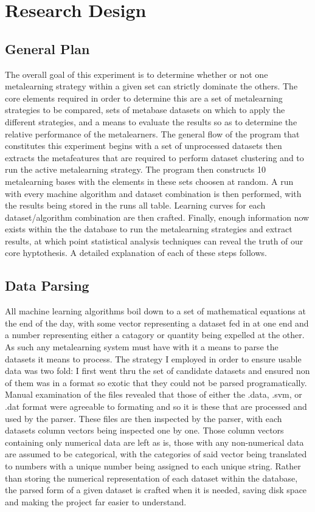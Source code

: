 \chapter{Research Design}
\label{Chapter3}
\section{General Plan}
The overall goal of this experiment is to determine whether or not one metalearning strategy within a given
set can strictly dominate the others. The core elements required in order to determine this are a set of metalearning strategies to be compared, sets of metabase datasets on which to apply the different strategies,
and a means to evaluate the results so as to determine the relative performance of the metalearners. The
general flow of the program that constitutes this experiment begins with a set of unprocessed datasets
then extracts the metafeatures that are required to perform dataset clustering and to run the active
metalearning strategy. The program then constructs 10 metalearning bases with the elements in these sets
choosen at random. A run with every machine algorithm and dataset combination is then performed, with the
results being stored in the runs all table. Learning curves for each dataset/algorithm combination are then crafted. Finally, enough information now exists within the the database to run the metalearning strategies
and extract results, at which point statistical analysis techniques can reveal the truth of our core
hyptothesis. A detailed explanation of each of these steps follows.

\section{Data Parsing}
All machine learning algorithms boil down to a set of mathematical equations at the end of the day, with
some vector representing a dataset fed in at one end and a number representing either a catagory or quantity
being expelled at the other. As such any metalearning system must have with it a means to parse the
datasets it means to process. The strategy I employed in order to ensure usable data was two fold: I first
went thru the set of candidate datasets and ensured non of them was in a format so exotic that they could
not be parsed programatically. Manual examination of the files revealed that those of either the .data,
.svm, or .dat format were agreeable to formating and so it is these that are processed and used by the
parser. These files are then inspected by the parser, with each datasets column vectors being inspected one
by one. Those column vectors containing only numerical data are left as is, those with any non-numerical
data are assumed to be categorical, with the categories of said vector being translated to numbers with a
unique number being assigned to each unique string. Rather than storing the numerical representation of
each dataset within the database, the parsed form of a given dataset is crafted when it is needed, saving
disk space and making the project far easier to understand.

